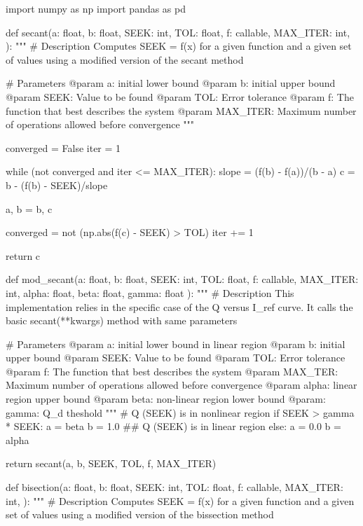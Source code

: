 import numpy as np
import pandas as pd


def secant(a: float,
           b: float,
           SEEK: int,
           TOL: float,
           f: callable,
           MAX_ITER: int,
           ):
    """
    # Description
    Computes SEEK = f(x) for a given function and a given set of values using a modified version of the secant method

    # Parameters
    @param a: initial lower bound
    @param b: initial upper bound
    @param SEEK: Value to be found
    @param TOL: Error tolerance
    @param f: The function that best describes the system 
    @param MAX_ITER: Maximum number of operations allowed before convergence
    """

    converged = False
    iter = 1

    while (not converged and iter <= MAX_ITER):
        slope = (f(b) - f(a))/(b - a)
        c = b - (f(b) - SEEK)/slope

        a, b = b, c

        converged = not (np.abs(f(c) - SEEK) > TOL)
        iter += 1

    return c


def mod_secant(a: float,
               b: float,
               SEEK: int,
               TOL: float,
               f: callable,
               MAX_ITER: int,
               alpha: float,
               beta: float,
               gamma: float
               ):
    """
    # Description
    This implementation relies in the specific case of the Q versus I_ref curve. It calls the basic secant(**kwargs) method with same parameters

    # Parameters
    @param a: initial lower bound in linear region
    @param b: initial upper bound
    @param SEEK: Value to be found
    @param TOL: Error tolerance
    @param f: The function that best describes the system 
    @param MAX_TER: Maximum number of operations allowed before convergence
    @param alpha: linear region upper bound
    @param beta: non-linear region lower bound
    @param: gamma: Q_d theshold
    """
    # Q (SEEK) is in nonlinear region
    if SEEK > gamma * SEEK:
        a = beta
        b = 1.0
    ## Q (SEEK) is in linear region
    else:
        a = 0.0
        b = alpha

    return secant(a, b, SEEK, TOL, f, MAX_ITER)


def bisection(a: float,
              b: float,
              SEEK: int,
              TOL: float,
              f: callable,
              MAX_ITER: int,
              ):
    """
    # Description
    Computes SEEK = f(x) for a given function and a given set of values using a modified version of the bissection method

